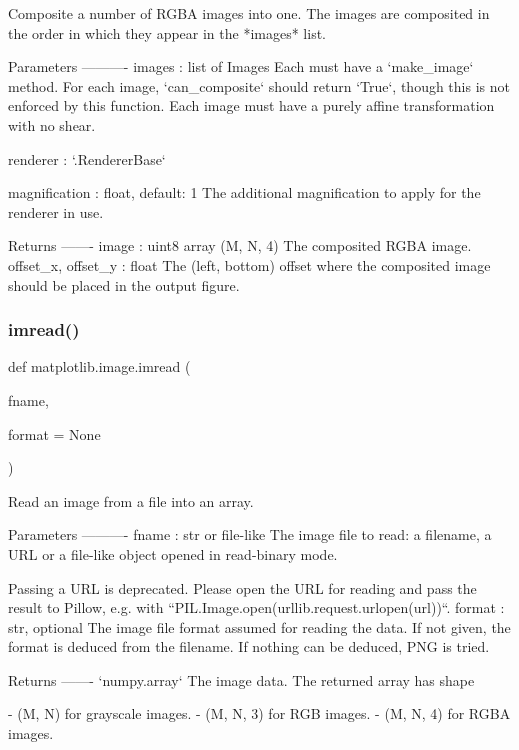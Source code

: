 \begin{DoxyVerb}Composite a number of RGBA images into one.  The images are
composited in the order in which they appear in the *images* list.

Parameters
----------
images : list of Images
    Each must have a `make_image` method.  For each image,
    `can_composite` should return `True`, though this is not
    enforced by this function.  Each image must have a purely
    affine transformation with no shear.

renderer : `.RendererBase`

magnification : float, default: 1
    The additional magnification to apply for the renderer in use.

Returns
-------
image : uint8 array (M, N, 4)
    The composited RGBA image.
offset_x, offset_y : float
    The (left, bottom) offset where the composited image should be placed
    in the output figure.
\end{DoxyVerb}
 \mbox{\label{namespacematplotlib_1_1image_a31944ffacf7bad0c380b9d4708c9b770}} 
\subsubsection{\texorpdfstring{imread()}{imread()}}
{\footnotesize\ttfamily def matplotlib.\+image.\+imread (\begin{DoxyParamCaption}\item[{}]{fname,  }\item[{}]{format = {\ttfamily None} }\end{DoxyParamCaption})}

\begin{DoxyVerb}Read an image from a file into an array.

Parameters
----------
fname : str or file-like
    The image file to read: a filename, a URL or a file-like object opened
    in read-binary mode.

    Passing a URL is deprecated.  Please open the URL
    for reading and pass the result to Pillow, e.g. with
    ``PIL.Image.open(urllib.request.urlopen(url))``.
format : str, optional
    The image file format assumed for reading the data. If not
    given, the format is deduced from the filename.  If nothing can
    be deduced, PNG is tried.

Returns
-------
`numpy.array`
    The image data. The returned array has shape

    - (M, N) for grayscale images.
    - (M, N, 3) for RGB images.
    - (M, N, 4) for RGBA images.
\end{DoxyVerb}
 \mbox{\label{namespacematplotlib_1_1image_a3937a6644e227cd804a36cfe4e9969e7}} 
